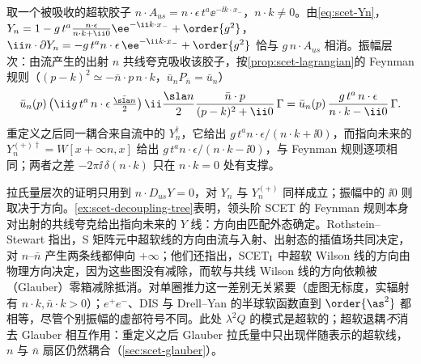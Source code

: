 \begin{example}\label{ex:scet-decoupling-tree}
取一个被吸收的超软胶子 $n\cdot A_{us}=n\cdot\epsilon\,t^a\ee^{-\ii k\cdot x_-}$，$n\cdot k\neq0$。由\cref{eq:scet-Yn}，$Y_n=1-g\,t^a\frac{n\cdot\epsilon}{n\cdot k+\ii0}\ee^{-\ii k\cdot x_-}+\order{g^2}$，$\ii n\cdot\partial Y_n=-g\,t^an\cdot\epsilon\,\ee^{-\ii k\cdot x_-}+\order{g^2}$ 恰与 $g\,n\cdot A_{us}$ 相消。振幅层次：由流产生的出射 $n$ 共线夸克吸收该胶子，按\cref{prop:scet-lagrangian}的 Feynman 规则（$(p-k)^2\simeq-\bar n\cdot p\,n\cdot k$，$\bar u_nP_{\bar n}=\bar u_n$）
\[
\bar u_n(p)\,\big(\ii g\,t^a\,n\cdot\epsilon\,\tfrac{\bar{\sla n}}{2}\big)\,\ii\frac{\sla n}{2}\frac{\bar n\cdot p}{(p-k)^2+\ii0}\,\Gamma=\bar u_n(p)\,\frac{g\,t^a\,n\cdot\epsilon}{n\cdot k-\ii0}\,\Gamma .
\]
重定义之后同一耦合来自流中的 $Y_n^\dagger$，它给出 $g\,t^a n\cdot\epsilon/(n\cdot k+\ii0)$，而指向未来的 $Y_n^{(+)\dagger}=W[x+\infty n,x]$ 给出 $g\,t^an\cdot\epsilon/(n\cdot k-\ii0)$，与 Feynman 规则逐项相同；两者之差 $-2\pi\ii\,\delta(n\cdot k)$ 只在 $n\cdot k=0$ 处有支撑。%
\end{example}

\begin{remark}[$Y_n$ 的方向与 $\ii0$]\label{rem:scet-y-direction}
拉氏量层次的证明只用到 $n\cdot D_{us}Y=0$，对 $Y_n$ 与 $Y_n^{(+)}$ 同样成立；振幅中的 $\ii0$ 则取决于方向。\cref{ex:scet-decoupling-tree}表明，领头阶 SCET 的 Feynman 规则本身对出射的共线夸克给出指向未来的 $Y$ 线：方向由匹配外态确定\cite{Chay:2004zn}。Rothstein--Stewart 指出，S 矩阵元中超软线的方向由流与入射、出射态的插值场共同决定，对 $n$–$\bar n$ 产生两条线都伸向 $+\infty$\cite[第~10.1~节]{RothsteinStewart2016}；他们还指出，SCET$_{\rm I}$ 中超软 Wilson 线的方向由物理方向决定，因为这些图没有减除，而软与共线 Wilson 线的方向依赖被（Glauber）零箱减除抵消\cite[第~4.2~节]{RothsteinStewart2016}。对单圈推力这一差别无关紧要（虚图无标度，实辐射有 $n\cdot k,\bar n\cdot k>0$）；$e^+e^-$、DIS 与 Drell--Yan 的半球软函数直到 $\order{\as^2}$ 都相等，尽管个别振幅的虚部符号不同\cite{Kang:2015moa}。此处 $\lambda^2Q$ 的模式是超软的；超软退耦\emph{不}消去 Glauber 相互作用：重定义之后 Glauber 拉氏量中只出现伴随表示的超软线，$n$ 与 $\bar n$ 扇区仍然耦合\cite[第~5.1~节]{RothsteinStewart2016}（\cref{sec:scet-glauber}）。
\end{remark}
